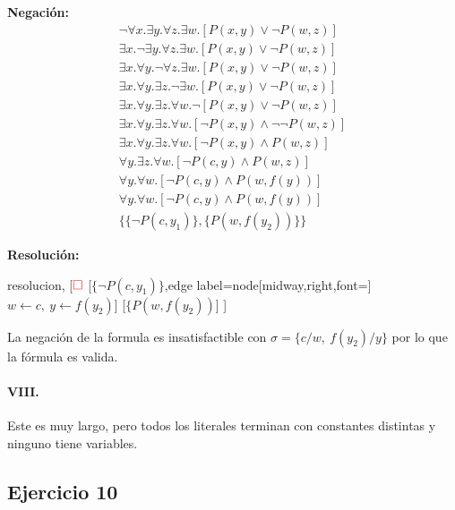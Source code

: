 \documentclass[10pt,a4paper]{article}
\begin{document}
\begin{multicols}{2}
\textbf{Negación:}
\begin{align*}
\lnot \forall x. \exists y. \forall z. \exists w. [P(x,y) \lor \lnot P(w,z)]  \\[1pt]
\exists x. \lnot \exists y. \forall z. \exists w. [P(x,y) \lor \lnot P(w,z)] \\[1pt]
\exists x. \forall y. \lnot \forall z. \exists w. [P(x,y) \lor \lnot P(w,z)]  \\[1pt]
\exists x. \forall y. \exists z. \lnot \exists w. [P(x,y) \lor \lnot P(w,z)] \\[1pt]
\exists x. \forall y. \exists z. \forall w. \lnot [P(x,y) \lor \lnot P(w,z)]  \\[1pt]
\exists x. \forall y. \exists z. \forall w. [\lnot P(x,y) \land \lnot \lnot P(w,z)] \\[1pt]
\exists x. \forall y. \exists z. \forall w. [\lnot P(x,y) \land P(w,z)] \\[1pt]
\forall y. \exists z. \forall w. [\lnot P(c,y) \land P(w,z)] \\[1pt]
\forall y.\forall w. [\lnot P(c,y) \land P(w,f(y))] \\[1pt]
\forall y. \forall w. [\lnot P(c,y) \land P(w,f(y))] \\[1pt]
\{\{ \lnot P(c,y_1) \}, \{P(w,f(y_2)) \} \}
\end{align*}

\textbf{Resolución:}
\begin{center}
	\begin{forest} resolucion,
[${\color{red}\Box}$ 
	[$\{ \lnot P(c\comma y_1) \}$,edge label={node[midway,right,font=\footnotesize] {$w\leftarrow c,~y\leftarrow f(y_2)$}}]
	[$\{P(w \comma f(y_2))$]
]
	\end{forest}
\end{center}
La negación de la formula es insatisfactible con $\sigma = \{ c/w,~f(y_2)/y\}$ por lo que la fórmula es valida.
\end{multicols}


\paragraph{VIII.} Este es muy largo, pero todos los literales terminan con constantes distintas y ninguno tiene variables.


\subsection{Ejercicio 10}
\end{document}
